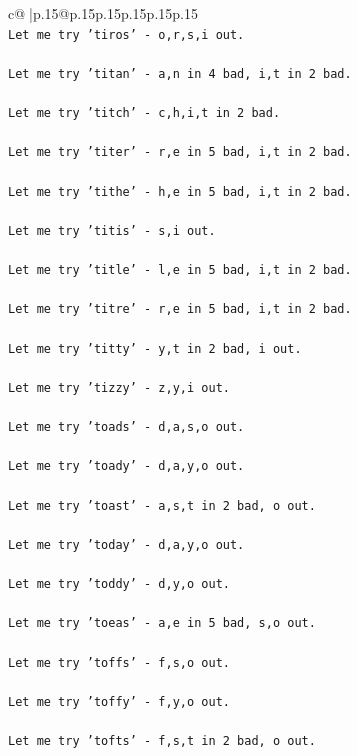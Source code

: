 \documentclass{article}
\begin{document}
{\begin{supertabular}{c@{$\;$}|p{.15\linewidth}@{}p{.15\linewidth}p{.15\linewidth}p{.15\linewidth}p{.15\linewidth}p{.15\linewidth}}
{{{\\ 
\texttt{Let me try 'tiros' {-} o,r,s,i out. } \\
\\ 
\texttt{Let me try 'titan' {-} a,n in 4 bad, i,t in 2 bad. } \\
\\ 
\texttt{Let me try 'titch' {-} c,h,i,t in 2 bad. } \\
\\ 
\texttt{Let me try 'titer' {-} r,e in 5 bad, i,t in 2 bad. } \\
\\ 
\texttt{Let me try 'tithe' {-} h,e in 5 bad, i,t in 2 bad. } \\
\\ 
\texttt{Let me try 'titis' {-} s,i out. } \\
\\ 
\texttt{Let me try 'title' {-} l,e in 5 bad, i,t in 2 bad. } \\
\\ 
\texttt{Let me try 'titre' {-} r,e in 5 bad, i,t in 2 bad. } \\
\\ 
\texttt{Let me try 'titty' {-} y,t in 2 bad, i out. } \\
\\ 
\texttt{Let me try 'tizzy' {-} z,y,i out. } \\
\\ 
\texttt{Let me try 'toads' {-} d,a,s,o out. } \\
\\ 
\texttt{Let me try 'toady' {-} d,a,y,o out. } \\
\\ 
\texttt{Let me try 'toast' {-} a,s,t in 2 bad, o out. } \\
\\ 
\texttt{Let me try 'today' {-} d,a,y,o out. } \\
\\ 
\texttt{Let me try 'toddy' {-} d,y,o out. } \\
\\ 
\texttt{Let me try 'toeas' {-} a,e in 5 bad, s,o out. } \\
\\ 
\texttt{Let me try 'toffs' {-} f,s,o out. } \\
\\ 
\texttt{Let me try 'toffy' {-} f,y,o out. } \\
\\ 
\texttt{Let me try 'tofts' {-} f,s,t in 2 bad, o out. } \\
}}}
\end{supertabular}}
\end{document}

